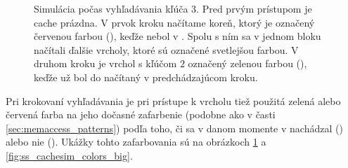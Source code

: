 \begin{figure}
    \centering
    \hspace{1cm}
    \hspace{1cm}
    \caption[Simulácia \cache počas vyhľadávania kľúča $3$]{Simulácia \cache počas vyhľadávania kľúča $3$. Pred prvým prístupom je cache prázdna. V prvok kroku načítame koreň, ktorý je označený červenou farbou (\miss), keďže nebol v \cache. Spolu s ním sa v jednom bloku načítali ďalšie vrcholy, ktoré sú označené svetlejšou farbou. V druhom kroku je vrchol s kľúčom $2$ označený zelenou farbou (\hit), keďže už bol do \cache načítaný v predchádzajúcom kroku.}
    \label{fig:ss_cachesim_colors}
\end{figure}

Pri krokovaní vyhľadávania je pri prístupe k vrcholu tiež použitá zelená alebo červená farba na jeho dočasné zafarbenie (podobne ako v časti \ref{sec:memaccess_patterns}) podľa toho, či sa v danom momente v \cache nachádzal (\hit) alebo nie (\miss). Ukážky tohto zafarbovania sú na obrázkoch \ref{fig:ss_cachesim_colors} a \ref{fig:ss_cachesim_colors_big}.

